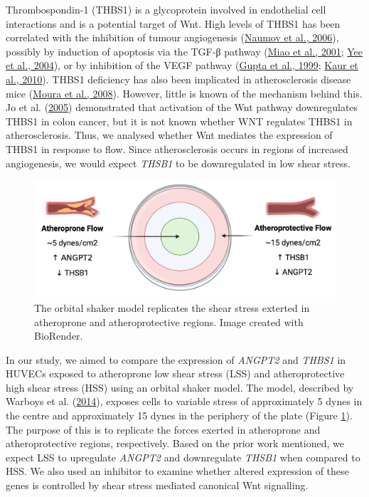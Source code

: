 \documentclass[
  11pt,
]{article}
\begin{document}
Thrombospondin-1 (THBS1) is a glycoprotein involved in endothelial cell interactions and is a potential target of Wnt.
High levels of THBS1 has been correlated with the inhibition of tumour angiogenesis (\protect\hyperlink{ref-naumov2006}{Naumov et al., 2006}), possibly by induction of apoptosis via the TGF-β pathway (\protect\hyperlink{ref-Miao2001}{Miao et al., 2001}; \protect\hyperlink{ref-yee2004}{Yee et al., 2004}), or by inhibition of the VEGF pathway (\protect\hyperlink{ref-gupta1999}{Gupta et al., 1999}; \protect\hyperlink{ref-kaur2010}{Kaur et al., 2010}).
THBS1 deficiency has also been implicated in atherosclerosis disease mice (\protect\hyperlink{ref-Moura2008}{Moura et al., 2008}).
However, little is known of the mechanism behind this.
Jo et al. (\protect\hyperlink{ref-jo2005}{2005}) demonstrated that activation of the Wnt pathway downregulates THBS1 in colon cancer, but it is not known whether WNT regulates THBS1 in atherosclerosis.
Thus, we analysed whether Wnt mediates the expression of THBS1 in response to flow.
Since atherosclerosis occurs in regions of increased angiogenesis, we would expect \emph{THSB1} to be downregulated in low shear stress.

\begin{figure}

{\centering \includegraphics[width=0.8\linewidth]{../images/orbital} 

}

\caption{The orbital shaker model replicates the shear stress exterted in atheroprone and atheroprotective regions. Image created with BioRender.}\label{fig:orbital}
\end{figure}

In our study, we aimed to compare the expression of \emph{ANGPT2} and \emph{THBS1} in HUVECs exposed to atheroprone low shear stress (LSS) and atheroprotective high shear stress (HSS) using an orbital shaker model.
The model, described by Warboys et al. (\protect\hyperlink{ref-Warboys2014}{2014}), exposes cells to variable stress of approximately 5 dynes in the centre and approximately 15 dynes in the periphery of the plate (Figure \ref{fig:orbital}).
The purpose of this is to replicate the forces exerted in atheroprone and atheroprotective regions, respectively.
Based on the prior work mentioned, we expect LSS to upregulate \emph{ANGPT2} and downregulate \emph{THSB1} when compared to HSS.
We also used an inhibitor to examine whether altered expression of these genes is controlled by shear stress mediated canonical Wnt signalling.
\end{document}
